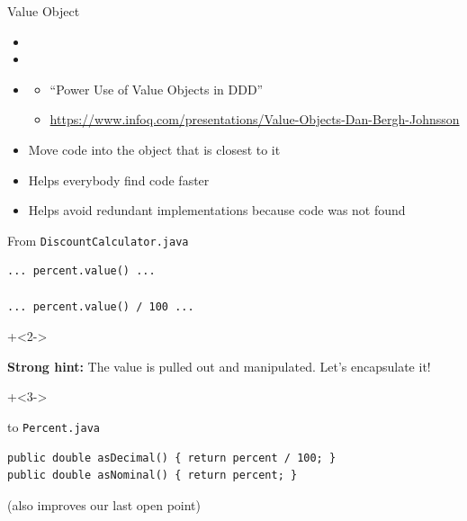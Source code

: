 \begin{frame}{Value Object}
\begin{itemize}
\item {}
\item {}
\item {}
\begin{itemize}
\item {} ``Power Use of Value Objects in DDD''
\item \url{https://www.infoq.com/presentations/Value-Objects-Dan-Bergh-Johnsson}
\end{itemize}
\end{itemize}
\end{frame}


\begin{frame}[fragile]{\de{}}

\begin{itemize}
\item Move code into the object that is closest to it
\item Helps everybody find code faster
\item Helps avoid redundant implementations because code was not found
\end{itemize}

\end{frame}

\begin{frame}[fragile]{\de{}}

From \texttt{DiscountCalculator.java}

\begin{lstlisting}
... percent.value() ...

... percent.value() / 100 ...
\end{lstlisting}

\onslide+<2->
\vspace{2em}

\textbf{Strong hint:} The value is pulled out and manipulated. Let's encapsulate it!

\onslide+<3->
\vspace{2em}

to \texttt{Percent.java}

\begin{lstlisting}
public double asDecimal() { return percent / 100; }
public double asNominal() { return percent; }
\end{lstlisting}

(also improves our last open point)

\end{frame}

